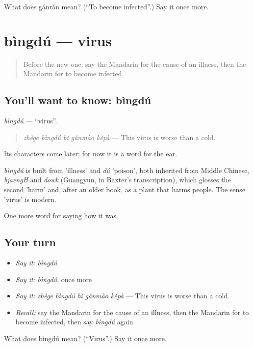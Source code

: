 \begin{tcolorbox}[breakable,colback=teal!4,colframe=teal!35!black,title={Before you move on}]
What does gǎnrǎn mean? (\textquotedblleft{}To become infected\textquotedblright{}.) Say it once more.
\end{tcolorbox}
\section[bìngdú]{bìngdú — virus}

\label{lesson:ZH-C481-bingdu}



\begin{quote}
Before the new one: say the Mandarin for the cause of an illness, then the Mandarin for to become infected.
\end{quote}

\subsection*{You'll want to know: bìngdú}
\emph{bìngdú} — \textquotedblleft{}virus\textquotedblright{}.

\begin{quote}
\emph{zhège bìngdú bǐ gǎnmào kěpà} — This virus is worse than a cold.
\end{quote}

Its characters come later; for now it is a word for the ear.

\begin{cousinweb}
\emph{bìngdú} is built from  'illness' and \emph{dú} 'poison', both inherited from Middle Chinese, \emph{bjaengH} and \emph{dowk} (Guangyun, in Baxter's transcription), which glosses the second 'harm' and, after an older book, as a plant that harms people. The sense 'virus' is modern.
\end{cousinweb}

\begin{grammarlens}[title={What you've built}]
One more word for saying how it was.
\end{grammarlens}

\subsection*{Your turn}
\begin{itemize}
\raggedright
  \item \emph{Say it:} \emph{bìngdú}
  \item \emph{Say it:} \emph{bìngdú}, once more
  \item \emph{Say it:} \emph{zhège bìngdú bǐ gǎnmào kěpà} — This virus is worse than a cold.
  \item \emph{Recall:} say the Mandarin for the cause of an illness, then the Mandarin for to become infected, then say \emph{bìngdú} again
\end{itemize}

\begin{tcolorbox}[breakable,colback=teal!4,colframe=teal!35!black,title={Before you move on}]
What does bìngdú mean? (\textquotedblleft{}Virus\textquotedblright{}.) Say it once more.
\end{tcolorbox}
